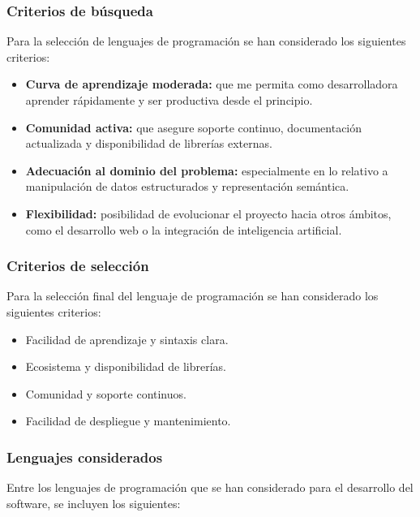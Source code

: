 \subsubsection{Criterios de búsqueda}
Para la selección de lenguajes de programación se han considerado los siguientes criterios:

\begin{itemize}
    \item \textbf{Curva de aprendizaje moderada: } que me permita como desarrolladora aprender
    rápidamente y ser productiva desde el principio.
    \item \textbf{Comunidad activa:} que asegure soporte continuo, documentación actualizada y 
    disponibilidad de librerías externas.
    \item \textbf{Adecuación al dominio del problema:} especialmente en lo relativo a 
    manipulación de datos estructurados y representación semántica.
    \item \textbf{Flexibilidad:} posibilidad de evolucionar el proyecto hacia otros ámbitos, 
    como el desarrollo web o la integración de inteligencia artificial.
\end{itemize}

\subsubsection{Criterios de selección}
Para la selección final del lenguaje de programación se han considerado los siguientes criterios:

\begin{itemize}
    \item Facilidad de aprendizaje y sintaxis clara.
    \item Ecosistema y disponibilidad de librerías.
    \item Comunidad y soporte continuos.
    \item Facilidad de despliegue y mantenimiento.
\end{itemize}

\subsubsection{Lenguajes considerados}
Entre los lenguajes de programación que se han considerado para el desarrollo del software, se 
incluyen los siguientes:

